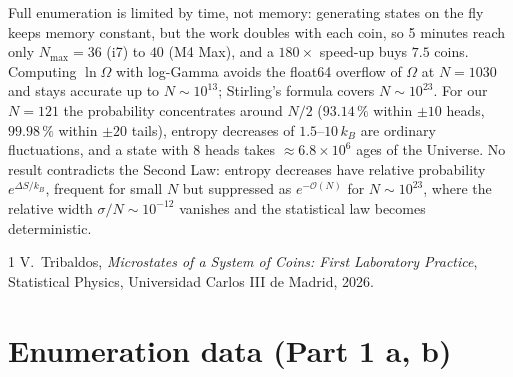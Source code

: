 \documentclass[11pt,a4paper]{article}
\begin{document}
Full enumeration is limited by time, not memory: generating states on the fly keeps memory constant, but the work doubles with each coin, so 5 minutes reach only $N_{\max}=36$ (i7) to $40$ (M4 Max), and a $180\times$ speed-up buys $7.5$ coins. Computing $\ln\Omega$ with log-Gamma avoids the float64 overflow of $\Omega$ at $N=1030$ and stays accurate up to $N\sim10^{13}$; Stirling's formula covers $N\sim10^{23}$. For our $N=121$ the probability concentrates around $N/2$ ($93.14\,\%$ within $\pm10$ heads, $99.98\,\%$ within $\pm20$ tails), entropy decreases of $1.5$--$10\,k_B$ are ordinary fluctuations, and a state with 8 heads takes $\approx6.8\times10^6$ ages of the Universe. No result contradicts the Second Law: entropy decreases have relative probability $e^{\Delta S/k_B}$, frequent for small $N$ but suppressed as $e^{-\mathcal O(N)}$ for $N\sim10^{23}$, where the relative width $\sigma/N\sim10^{-12}$ vanishes and the statistical law becomes deterministic.

\begin{thebibliography}{1}
 V.~Tribaldos, \emph{Microstates of a System of Coins: First Laboratory Practice}, Statistical Physics, Universidad Carlos III de Madrid, 2026.
\end{thebibliography}

\clearpage
\appendix
\section{Enumeration data (Part 1 a, b)}
\label{app:n7}
\end{document}
